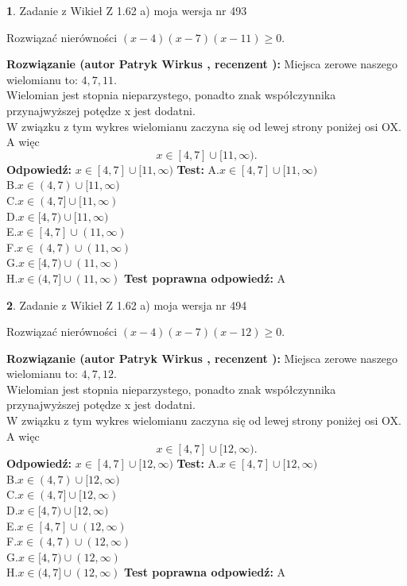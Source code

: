\documentclass[12pt, a4paper]{article}
\theoremstyle{definition} %
\newtheorem{zad}{}
\newcommand{\zadStart}[1]{\begin{zad}#1\newline}
\newcommand{\zadStop}{\end{zad}}
\newcommand{\rozwStart}[2]{\noindent \textbf{Rozwiązanie (autor #1 , recenzent #2): }\newline}
\newcommand{\rozwStop}{\newline}
\newcommand{\odpStart}{\noindent \textbf{Odpowiedź:}\newline}
\newcommand{\odpStop}{\newline}
\newcommand{\testStart}{\noindent \textbf{Test:}\newline}
\newcommand{\testStop}{\newline}
\newcommand{\kluczStart}{\noindent \textbf{Test poprawna odpowiedź:}\newline}
\newcommand{\kluczStop}{\newline}
\begin{document}
\zadStart{Zadanie z Wikieł Z 1.62 a) moja wersja nr 493}

Rozwiązać nierówności $(x-4)(x-7)(x-11)\ge0$.
\zadStop
\rozwStart{Patryk Wirkus}{}
Miejsca zerowe naszego wielomianu to: $4, 7, 11$.\\
Wielomian jest stopnia nieparzystego, ponadto znak współczynnika przy\linebreak najwyższej potędze x jest dodatni.\\ W związku z tym wykres wielomianu zaczyna się od lewej strony poniżej osi OX. A więc $$x \in [4,7] \cup [11,\infty).$$
\rozwStop
\odpStart
$x \in [4,7] \cup [11,\infty)$
\odpStop
\testStart
A.$x \in [4,7] \cup [11,\infty)$\\
B.$x \in (4,7) \cup [11,\infty)$\\
C.$x \in (4,7] \cup [11,\infty)$\\
D.$x \in [4,7) \cup [11,\infty)$\\
E.$x \in [4,7] \cup (11,\infty)$\\
F.$x \in (4,7) \cup (11,\infty)$\\
G.$x \in [4,7) \cup (11,\infty)$\\
H.$x \in (4,7] \cup (11,\infty)$
\testStop
\kluczStart
A
\kluczStop



\zadStart{Zadanie z Wikieł Z 1.62 a) moja wersja nr 494}

Rozwiązać nierówności $(x-4)(x-7)(x-12)\ge0$.
\zadStop
\rozwStart{Patryk Wirkus}{}
Miejsca zerowe naszego wielomianu to: $4, 7, 12$.\\
Wielomian jest stopnia nieparzystego, ponadto znak współczynnika przy\linebreak najwyższej potędze x jest dodatni.\\ W związku z tym wykres wielomianu zaczyna się od lewej strony poniżej osi OX. A więc $$x \in [4,7] \cup [12,\infty).$$
\rozwStop
\odpStart
$x \in [4,7] \cup [12,\infty)$
\odpStop
\testStart
A.$x \in [4,7] \cup [12,\infty)$\\
B.$x \in (4,7) \cup [12,\infty)$\\
C.$x \in (4,7] \cup [12,\infty)$\\
D.$x \in [4,7) \cup [12,\infty)$\\
E.$x \in [4,7] \cup (12,\infty)$\\
F.$x \in (4,7) \cup (12,\infty)$\\
G.$x \in [4,7) \cup (12,\infty)$\\
H.$x \in (4,7] \cup (12,\infty)$
\testStop
\kluczStart
A
\kluczStop
\end{document}
